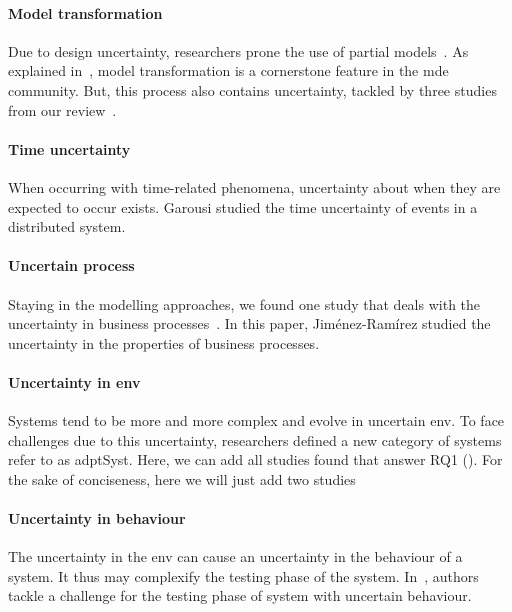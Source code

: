 \paragraph{Model transformation}
Due to design uncertainty, researchers prone the use of partial models~\cite{DBLP:conf/icse/FamelisSC12}.
As explained in~, model transformation is a cornerstone feature in the \gls{mde} community.
But, this process also contains uncertainty, tackled by three studies from our review~\cite{DBLP:conf/models/BurguenoBMV18, DBLP:conf/sle/EramoPR15, DBLP:conf/icse/EramoPR14}.
	
\paragraph{Time uncertainty}
When occurring with time-related phenomena, uncertainty about when they are expected to occur exists.
Garousi \etal studied the time uncertainty of events in a distributed system.
	
\paragraph{Uncertain process}
Staying in the modelling approaches, we found one study that deals with the uncertainty in business processes~\cite{DBLP:journals/infsof/Jimenez-RamirezW0V15}.
In this paper, Jiménez-Ramírez \etal studied the uncertainty in the properties of business processes.	
	
\paragraph{Uncertainty in \gls{env}}
Systems tend to be more and more complex and evolve in uncertain \gls{env}.
To face challenges due to this uncertainty, researchers defined a new category of systems refer to as \gls{adptSyst}.
Here, we can add all studies found that answer RQ1 (\cf {}).
For the sake of conciseness, here we will just add two studies~\cite{DBLP:conf/dagstuhl/EsfahaniM10, DBLP:conf/ecmdafa/ZhangSAYON16}

\paragraph{Uncertainty in \gls{behaviour}}
The uncertainty in the \gls{env} can cause an uncertainty in the behaviour of a system.
It thus may complexify the testing phase of the system.
In~\cite{DBLP:journals/sosym/Zhang00NO19}, authors tackle a challenge for the testing phase of system with uncertain \gls{behaviour}.
	
